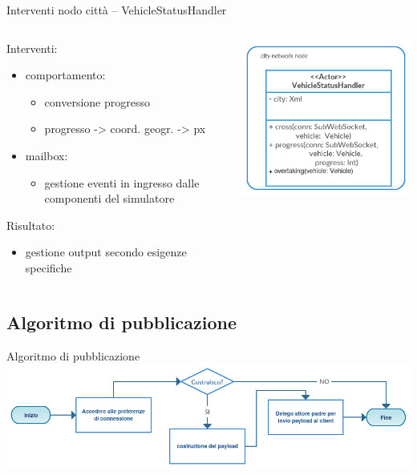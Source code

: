 \begin{frame}{Interventi nodo città -- \scriptsize{VehicleStatusHandler}}
	\begin{columns}
		\begin{column}{0.6\textwidth}
			Interventi:
			\begin{itemize}
				\item{\footnotesize{comportamento:}}
				\begin{itemize}
					\item{\scriptsize{conversione progresso}}
					\item{\scriptsize{progresso -> coord. geogr. -> px}}
				\end{itemize}
				\item{\footnotesize{mailbox:}}
				\begin{itemize}
					\item{\scriptsize{gestione eventi in ingresso dalle componenti del simulatore}}
				\end{itemize}
			\end{itemize}
			Risultato:
			\begin{itemize}
				\item{\footnotesize{gestione output secondo esigenze specifiche}}
			\end{itemize}
		\end{column}
		\begin{column}{0.4\textwidth}
			\centering
			\includegraphics[scale=0.35]{images/vehicleStatusHandler.png}
		\end{column}
	\end{columns}
\end{frame}

\subsection{Algoritmo di pubblicazione}
\begin{frame}{Algoritmo di pubblicazione}
	\centering
	\includegraphics[scale=0.35]{images/shipPhase.png}
\end{frame}

